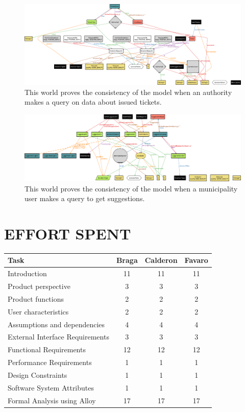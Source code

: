 \documentclass[a4paper]{article}
\begin{document}
\newpage



\begin{figure}[H]
\centering
\includegraphics[width=\textwidth]{alloy/world_ticket_query}
\caption{This world proves the consistency of the model when an authority
makes a query on data about issued tickets.}
\end{figure}

\newpage



\begin{figure}[H]
\centering
\includegraphics[width=\textwidth]{alloy/world_suggestion_query}
\caption{This world proves the consistency of the model when a
municipality user makes a query to get suggestions.}
\end{figure}

\newpage

\section{EFFORT SPENT}\label{effort_spent}

\begin{table}[H]
\centering
\begin{tabular}{|l|c|c|c|}
\hline
Task & Braga & Calderon & Favaro\tabularnewline
\hline
Introduction & 11 & 11 & 11\tabularnewline
Product perspective & 3 & 3 & 3\tabularnewline
Product functions & 2 & 2 & 2\tabularnewline
User characteristics & 2 & 2 & 2\tabularnewline
Assumptions and dependencies & 4 & 4 & 4\tabularnewline
External Interface Requirements & 3 & 3 & 3\tabularnewline
Functional Requirements & 12 & 12 & 12\tabularnewline
Performance Requirements & 1 & 1 & 1\tabularnewline
Design Constraints & 1 & 1 & 1\tabularnewline
Software System Attributes & 1 & 1 & 1\tabularnewline
Formal Analysis using Alloy & 17 & 17 & 17\tabularnewline
\hline
\end{tabular}
\end{table}
\end{document}
